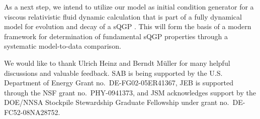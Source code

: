 \documentclass[aps,prc,reprint,amsmath,nofootinbib]{revtex4-1}
\begin{document}
As a next step, we intend to utilize our model as initial condition generator for a viscous relativistic fluid dynamic calculation that is part of a fully dynamical model for evolution and decay of a sQGP \cite{Shen:2014vra}.
This will form the basis of a modern framework for determination of fundamental sQGP properties through a systematic model-to-data comparison.


We would like to thank Ulrich Heinz and Berndt M\"uller for many helpful discussions and valuable feedback.
SAB is being supported by the U.S. Department of Energy Grant no.~DE-FG02-05ER41367,
JEB is supported through the NSF grant no.~PHY-0941373,
and JSM acknowledges support by the DOE/NNSA Stockpile Stewardship Graduate Fellowship under grant no.~DE-FC52-08NA28752.


%
\end{document}
